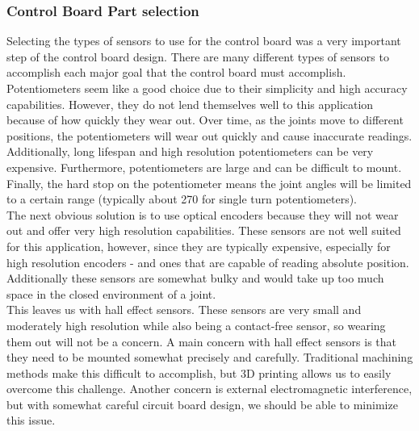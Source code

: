 \subsubsection{Control Board Part selection}
Selecting the types of sensors to use for the control board was a very important step of the control board design. There are many different types of sensors to accomplish each major goal that the control board must accomplish.
Potentiometers seem like a good choice due to their simplicity and high accuracy capabilities. However, they do not lend themselves well to this application because of how quickly they wear out. Over time, as the joints move to different positions, the potentiometers will wear out quickly and cause inaccurate readings. Additionally, long lifespan and high resolution potentiometers can be very expensive. Furthermore, potentiometers are large and can be difficult to mount. Finally, the hard stop on the potentiometer means the joint angles will be limited to a certain range (typically about 270 \textdegree  for single turn potentiometers).\\
\newline
The next obvious solution is to use optical encoders because they will not wear out and offer very high resolution capabilities. These sensors are not well suited for this application, however, since they are typically expensive, especially for high resolution encoders - and ones that are capable of reading absolute position. Additionally these sensors are somewhat bulky and would take up too much space in the closed environment of a joint. \\
\newline
This leaves us with hall effect sensors. These sensors are very small and moderately high resolution while also being a contact-free sensor, so wearing them out will not be a concern. A main concern with hall effect sensors is that they need to be mounted somewhat precisely and carefully. Traditional machining methods make this difficult to accomplish, but 3D printing allows us to easily overcome this challenge.  Another concern is external electromagnetic interference, but with somewhat careful circuit board design, we should be able to minimize this issue.

